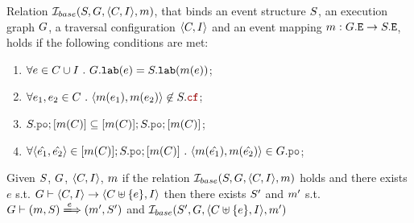 \documentclass[12pt]{article}
\begin{document}
\begin{definition}
  Relation $\mathcal{I}_{base}(S, G, \langle C, I \rangle, m)$, that binds an 
  event structure $S$, an \imm execution graph $G$,
  a traversal configuration $\langle C, I \rangle$ and
  an event mapping $m : G.{\mathtt{E}} \rightarrow S.{\mathtt{E}}$,
  holds if the following conditions are met:
  \begin{enumerate}[label=\textbf{S.\arabic*}]
    \item \label{item:sim-lab}
      $\forall{e \in C\cup I} ~.~ G.{\mathtt{lab}}(e) = S.{\mathtt{lab}}(m(e))$;
    \item \label{item:sim-cf}
      $\forall{e_1, e_2 \in \lC} ~.~ \tup{\lM(e_1), \lM(e_2)} \not\in \lES.\lCF$;
    \item \label{item:sim-po-prfx} 
      $\lES.\lPO;[\lM(\lC)] \subseteq [\lM(\lC)];\lES.\lPO;[\lM(\lC)]$;
    \item \label{item:sim-po} 
      $\forall{\tup{\hat{e_1}, \hat{e_2}} \in [\lM(\lC)];\lES.\lPO;[\lM(\lC)]} ~.~
        \tup{\lM(\hat{e_1}), \lM(\hat{e_2})} \in \lG.\lPO$;
  \end{enumerate}
\end{definition}

\begin{lemma}
  Given $S$, $G$, $\langle C, I \rangle$, $m$
  if the relation $\mathcal{I}_{base}(S, G, \langle C, I \rangle, m)$ holds and 
  there exists $e$ s.t. $G \vdash \langle C, I \rangle \rightarrow \langle C \uplus \{e\}, I \rangle$
  then there exists $S'$ and $m'$ s.t. $\lG \vdash (\lM, \lES) \ESbasicstep{e} (\lM', \lES')$
  and $\mathcal{I}_{base}(S', G, \langle C \uplus \{e\}, I \rangle, m')$ 
\end{lemma}
\end{document}
